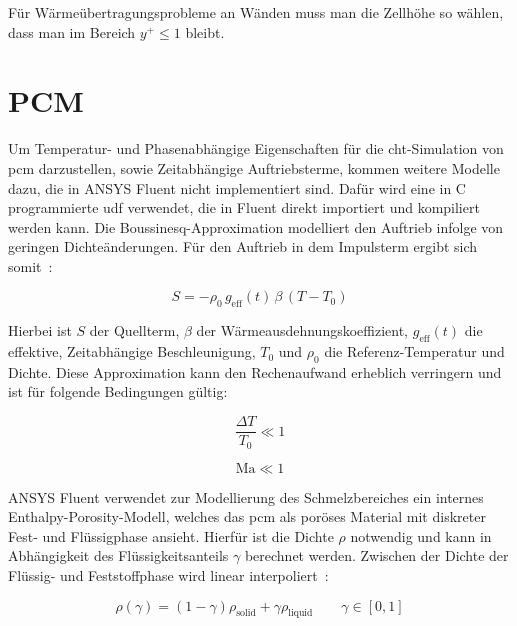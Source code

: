 Für Wärmeübertragungsprobleme an Wänden muss man die Zellhöhe so wählen, dass man im Bereich $y^+ \leq 1$ bleibt.

\section*{PCM}
Um Temperatur- und Phasenabhängige Eigenschaften für die \ac{cht}-Simulation von \ac{pcm} darzustellen, sowie Zeitabhängige Auftriebsterme, kommen weitere Modelle dazu,
die in ANSYS Fluent nicht implementiert sind. Dafür wird eine in C programmierte \ac{udf} verwendet, die in Fluent direkt importiert
und kompiliert werden kann.
Die Boussinesq-Approximation modelliert den Auftrieb infolge von geringen Dichteänderungen. Für den Auftrieb
in dem Impulsterm ergibt sich somit~\cite{akamcae-udf}:

\begin{equation}
  \label{eq:udf_bouss}
  S = -\rho_0 \, g_\text{eff}(t)\,\beta\,(T-T_0)
\end{equation}

Hierbei ist $S$ der Quellterm, $\beta$ der Wärmeausdehnungskoeffizient, $g_\text{eff}(t)$ die effektive, Zeitabhängige Beschleunigung,
$T_0$ und $\rho_0$ die Referenz-Temperatur und Dichte. Diese Approximation kann den Rechenaufwand erheblich verringern und ist für folgende Bedingungen gültig:

\noindent\begin{minipage}{.5\linewidth}
  \begin{equation}
    \label{eq:bossinesque_bedingung1}
    \frac{\Delta T}{T_0} \ll 1
  \end{equation}
\end{minipage}%
\begin{minipage}{.5\linewidth}
  \begin{equation}
    \label{eq:bossinesque_bedingung2}
    \text{Ma} \ll 1
  \end{equation}
\end{minipage}

ANSYS Fluent verwendet zur Modellierung des Schmelzbereiches ein internes \allowbreak Enthalpy-Porosity-Modell, welches das \ac{pcm} als poröses Material
mit diskreter Fest- und Flüssigphase ansieht. Hierfür ist die Dichte $\rho$ notwendig und kann in Abhängigkeit des Flüssigkeitsanteils $\gamma$ berechnet werden.
Zwischen der Dichte der Flüssig- und Feststoffphase wird linear interpoliert~\cite{akamcae-udf}:

\begin{equation}
  \label{eq:udf_dichte}
  \rho(\gamma) = \left(1- \gamma\right) \rho_\text{solid} + \gamma \rho_\text{liquid} \qquad \gamma \in [0,1]
\end{equation}

